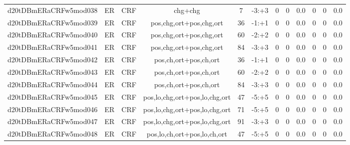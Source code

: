 \documentclass[a4paper]{article}
\begin{document}
\begin{landscape}
\begin{center}
\begin{tabular}{ |c|c|c|c|c|c|c|c|c|c|c|c|}
 
 	
 	\small{ d20tDBmERaCRFw5mod038 } & ER & CRF & chg+chg  &  7 &  -3:+3  &  0 & 0 & 0.0  &  0 & 0 & 0.0 \\
 	

 
 	
 	\small{ d20tDBmERaCRFw5mod039 } & ER & CRF & pos,chg,ort+pos,chg,ort  &  36 &  -1:+1  &  0 & 0 & 0.0  &  0 & 0 & 0.0 \\
 	

 
 	
 	\small{ d20tDBmERaCRFw5mod040 } & ER & CRF & pos,chg,ort+pos,chg,ort  &  60 &  -2:+2  &  0 & 0 & 0.0  &  0 & 0 & 0.0 \\
 	

 
 	
 	\small{ d20tDBmERaCRFw5mod041 } & ER & CRF & pos,chg,ort+pos,chg,ort  &  84 &  -3:+3  &  0 & 0 & 0.0  &  0 & 0 & 0.0 \\
 	

 
 	
 	\small{ d20tDBmERaCRFw5mod042 } & ER & CRF & pos,ch,ort+pos,ch,ort  &  36 &  -1:+1  &  0 & 0 & 0.0  &  0 & 0 & 0.0 \\
 	

 
 	
 	\small{ d20tDBmERaCRFw5mod043 } & ER & CRF & pos,ch,ort+pos,ch,ort  &  60 &  -2:+2  &  0 & 0 & 0.0  &  0 & 0 & 0.0 \\
 	

 
 	
 	\small{ d20tDBmERaCRFw5mod044 } & ER & CRF & pos,ch,ort+pos,ch,ort  &  84 &  -3:+3  &  0 & 0 & 0.0  &  0 & 0 & 0.0 \\
 	

 
 	
 	\small{ d20tDBmERaCRFw5mod045 } & ER & CRF & pos,lo,chg,ort+pos,lo,chg,ort  &  47 &  -5:+5  &  0 & 0 & 0.0  &  0 & 0 & 0.0 \\
 	

 
 	
 	\small{ d20tDBmERaCRFw5mod046 } & ER & CRF & pos,lo,chg,ort+pos,lo,chg,ort  &  71 &  -5:+5  &  0 & 0 & 0.0  &  0 & 0 & 0.0 \\
 	

 
 	
 	\small{ d20tDBmERaCRFw5mod047 } & ER & CRF & pos,lo,chg,ort+pos,lo,chg,ort  &  91 &  -3:+3  &  0 & 0 & 0.0  &  0 & 0 & 0.0 \\
 	

 
 	
 	\small{ d20tDBmERaCRFw5mod048 } & ER & CRF & pos,lo,ch,ort+pos,lo,ch,ort  &  47 &  -5:+5  &  0 & 0 & 0.0  &  0 & 0 & 0.0 \\
 	


\end{tabular}
\end{center}
\end{landscape}
\end{document}
